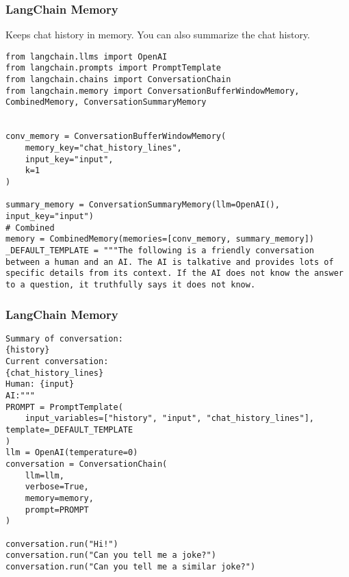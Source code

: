 \begin{frame}[fragile]\frametitle{LangChain Memory}

Keeps chat history in memory. You can also summarize the chat history.

\begin{lstlisting}
from langchain.llms import OpenAI
from langchain.prompts import PromptTemplate
from langchain.chains import ConversationChain
from langchain.memory import ConversationBufferWindowMemory, CombinedMemory, ConversationSummaryMemory


conv_memory = ConversationBufferWindowMemory(
    memory_key="chat_history_lines",
    input_key="input",
    k=1
)

summary_memory = ConversationSummaryMemory(llm=OpenAI(), input_key="input")
# Combined
memory = CombinedMemory(memories=[conv_memory, summary_memory])
_DEFAULT_TEMPLATE = """The following is a friendly conversation between a human and an AI. The AI is talkative and provides lots of specific details from its context. If the AI does not know the answer to a question, it truthfully says it does not know.

\end{lstlisting}	  

\end{frame}


\begin{frame}[fragile]\frametitle{LangChain Memory}


\begin{lstlisting}
Summary of conversation:
{history}
Current conversation:
{chat_history_lines}
Human: {input}
AI:"""
PROMPT = PromptTemplate(
    input_variables=["history", "input", "chat_history_lines"], template=_DEFAULT_TEMPLATE
)
llm = OpenAI(temperature=0)
conversation = ConversationChain(
    llm=llm, 
    verbose=True, 
    memory=memory,
    prompt=PROMPT
)

conversation.run("Hi!")
conversation.run("Can you tell me a joke?")
conversation.run("Can you tell me a similar joke?")
\end{lstlisting}	  

\end{frame}


